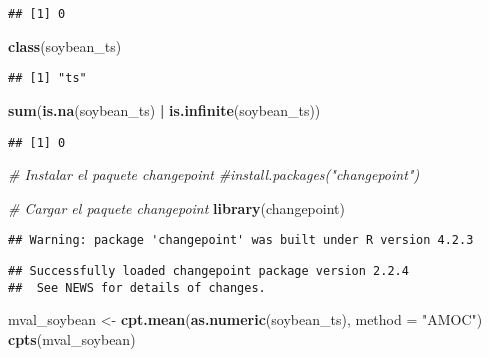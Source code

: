 \documentclass[
]{book}
\newenvironment{Shaded}{\begin{snugshade}}{\end{snugshade}}
\newcommand{\AttributeTok}[1]{\textcolor[rgb]{0.13,0.29,0.53}{#1}}
\newcommand{\CommentTok}[1]{\textcolor[rgb]{0.56,0.35,0.01}{\textit{#1}}}
\newcommand{\FunctionTok}[1]{\textcolor[rgb]{0.13,0.29,0.53}{\textbf{#1}}}
\newcommand{\NormalTok}[1]{#1}
\newcommand{\OtherTok}[1]{\textcolor[rgb]{0.56,0.35,0.01}{#1}}
\newcommand{\SpecialCharTok}[1]{\textcolor[rgb]{0.81,0.36,0.00}{\textbf{#1}}}
\newcommand{\StringTok}[1]{\textcolor[rgb]{0.31,0.60,0.02}{#1}}
\begin{document}
\begin{verbatim}
## [1] 0
\end{verbatim}

\begin{Shaded}
\begin{Highlighting}[]
\FunctionTok{class}\NormalTok{(soybean\_ts)}
\end{Highlighting}
\end{Shaded}

\begin{verbatim}
## [1] "ts"
\end{verbatim}

\begin{Shaded}
\begin{Highlighting}[]
\FunctionTok{sum}\NormalTok{(}\FunctionTok{is.na}\NormalTok{(soybean\_ts) }\SpecialCharTok{|} \FunctionTok{is.infinite}\NormalTok{(soybean\_ts))}
\end{Highlighting}
\end{Shaded}

\begin{verbatim}
## [1] 0
\end{verbatim}

\begin{Shaded}
\begin{Highlighting}[]
\CommentTok{\# Instalar el paquete changepoint}
\CommentTok{\#install.packages("changepoint")}

\CommentTok{\# Cargar el paquete changepoint}
\FunctionTok{library}\NormalTok{(changepoint)}
\end{Highlighting}
\end{Shaded}

\begin{verbatim}
## Warning: package 'changepoint' was built under R version 4.2.3
\end{verbatim}

\begin{verbatim}
## Successfully loaded changepoint package version 2.2.4
##  See NEWS for details of changes.
\end{verbatim}

\begin{Shaded}
\begin{Highlighting}[]
\NormalTok{mval\_soybean }\OtherTok{\textless{}{-}} \FunctionTok{cpt.mean}\NormalTok{(}\FunctionTok{as.numeric}\NormalTok{(soybean\_ts), }\AttributeTok{method =} \StringTok{"AMOC"}\NormalTok{)}
\FunctionTok{cpts}\NormalTok{(mval\_soybean)}
\end{Highlighting}
\end{Shaded}
\end{document}
